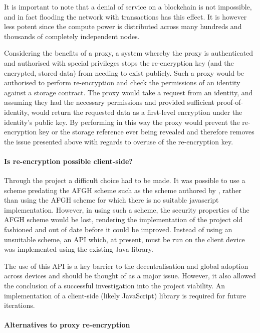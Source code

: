 It is important to note that a denial of service on a blockchain is not impossible, and in fact flooding the network with transactions has this effect. It is however less potent since the compute power is distributed across many hundreds and thousands of completely independent nodes.

Considering the benefits of a proxy, a system whereby the proxy is authenticated and authorised with special privileges stops the re-encryption key (and the encrypted, stored data) from needing to exist publicly. Such a proxy would be authorised to perform re-encryption and check the permissions of an identity against a storage contract. The proxy would take a request from an identity, and assuming they had the necessary permissions and provided sufficient proof-of-identity, would return the requested data as a first-level encryption under the identity's public key. By performing in this way the proxy would prevent the re-encryption key or the storage reference ever being revealed and therefore removes the issue presented above with regards to overuse of the re-encryption key.

\paragraph{Is re-encryption possible client-side?}

Through the project a difficult choice had to be made. It was possible to use a scheme predating the AFGH scheme such as the scheme authored by \cite{bbs:1998:book}, rather than using the AFGH scheme for which there is no suitable javascript implementation. However, in using such a scheme, the security properties of the AFGH scheme would be lost, rendering the implementation of the project old fashioned and out of date before it could be improved. Instead of using an unsuitable scheme, an API which, at present, must be run on the client device was implemented using the existing Java library.

The use of this API is a key barrier to the decentralisation and global adoption across devices and should be thought of as a major issue. However, it also allowed the conclusion of a successful investigation into the project viability. An implementation of a client-side (likely JavaScript) library is required for future iterations.

\paragraph{Alternatives to proxy re-encryption}

